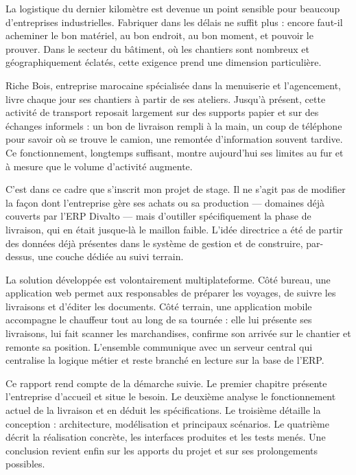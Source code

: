 \documentclass[12pt,a4paper]{report}
\begin{document}
La logistique du dernier kilomètre est devenue un point sensible pour beaucoup d'entreprises industrielles. Fabriquer dans les délais ne suffit plus : encore faut-il acheminer le bon matériel, au bon endroit, au bon moment, et pouvoir le prouver. Dans le secteur du bâtiment, où les chantiers sont nombreux et géographiquement éclatés, cette exigence prend une dimension particulière.

Riche Bois, entreprise marocaine spécialisée dans la menuiserie et l'agencement, livre chaque jour ses chantiers à partir de ses ateliers. Jusqu'à présent, cette activité de transport reposait largement sur des supports papier et sur des échanges informels : un bon de livraison rempli à la main, un coup de téléphone pour savoir où se trouve le camion, une remontée d'information souvent tardive. Ce fonctionnement, longtemps suffisant, montre aujourd'hui ses limites au fur et à mesure que le volume d'activité augmente.

C'est dans ce cadre que s'inscrit mon projet de stage. Il ne s'agit pas de modifier la façon dont l'entreprise gère ses achats ou sa production — domaines déjà couverts par l'ERP Divalto — mais d'outiller spécifiquement la phase de livraison, qui en était jusque-là le maillon faible. L'idée directrice a été de partir des données déjà présentes dans le système de gestion et de construire, par-dessus, une couche dédiée au suivi terrain.

La solution développée est volontairement multiplateforme. Côté bureau, une application web permet aux responsables de préparer les voyages, de suivre les livraisons et d'éditer les documents. Côté terrain, une application mobile accompagne le chauffeur tout au long de sa tournée : elle lui présente ses livraisons, lui fait scanner les marchandises, confirme son arrivée sur le chantier et remonte sa position. L'ensemble communique avec un serveur central qui centralise la logique métier et reste branché en lecture sur la base de l'ERP.

Ce rapport rend compte de la démarche suivie. Le premier chapitre présente l'entreprise d'accueil et situe le besoin. Le deuxième analyse le fonctionnement actuel de la livraison et en déduit les spécifications. Le troisième détaille la conception : architecture, modélisation et principaux scénarios. Le quatrième décrit la réalisation concrète, les interfaces produites et les tests menés. Une conclusion revient enfin sur les apports du projet et sur ses prolongements possibles.

\newpage
\end{document}
